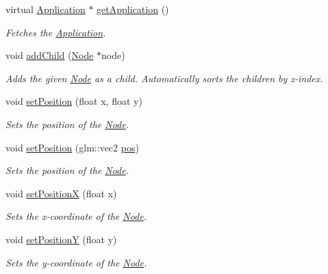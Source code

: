 \begin{DoxyCompactItemize}
virtual \mbox{\hyperlink{classsage_1_1Application}{Application}} $\ast$ \mbox{\hyperlink{classsage_1_1Node_af0f8bb1150be77ccc56cf470f3058176}{get\+Application}} ()
\begin{DoxyCompactList}\small\item\em Fetches the \mbox{\hyperlink{classsage_1_1Application}{Application}}. \end{DoxyCompactList}\item 
void \mbox{\hyperlink{classsage_1_1Node_ae7bf832d6fd80f69a244ae3dad7b3fb4}{add\+Child}} (\mbox{\hyperlink{classsage_1_1Node}{Node}} $\ast$node)
\begin{DoxyCompactList}\small\item\em Adds the given \mbox{\hyperlink{classsage_1_1Node}{Node}} as a child. Automatically sorts the children by z-\/index. \end{DoxyCompactList}\item 
void \mbox{\hyperlink{classsage_1_1Node_aaa8545c103ef1b35e5076dbedab93af5}{set\+Position}} (float x, float y)
\begin{DoxyCompactList}\small\item\em Sets the position of the \mbox{\hyperlink{classsage_1_1Node}{Node}}. \end{DoxyCompactList}\item 
void \mbox{\hyperlink{classsage_1_1Node_ae2731cefe38e706c2bf21afae6da18b3}{set\+Position}} (glm\+::vec2 \mbox{\hyperlink{classsage_1_1Node_a7e0ae6eeb84fae60e54e6685c982b0b2}{pos}})
\begin{DoxyCompactList}\small\item\em Sets the position of the \mbox{\hyperlink{classsage_1_1Node}{Node}}. \end{DoxyCompactList}\item 
void \mbox{\hyperlink{classsage_1_1Node_ae1dfc73d6122a95778d5d9db3d1fd913}{set\+PositionX}} (float x)
\begin{DoxyCompactList}\small\item\em Sets the x-\/coordinate of the \mbox{\hyperlink{classsage_1_1Node}{Node}}. \end{DoxyCompactList}\item 
void \mbox{\hyperlink{classsage_1_1Node_a5c97d36655f0daa71a5f6c715d2b0470}{set\+PositionY}} (float y)
\begin{DoxyCompactList}\small\item\em Sets the y-\/coordinate of the \mbox{\hyperlink{classsage_1_1Node}{Node}}. \end{DoxyCompactList}\item 

\end{DoxyCompactItemize}
